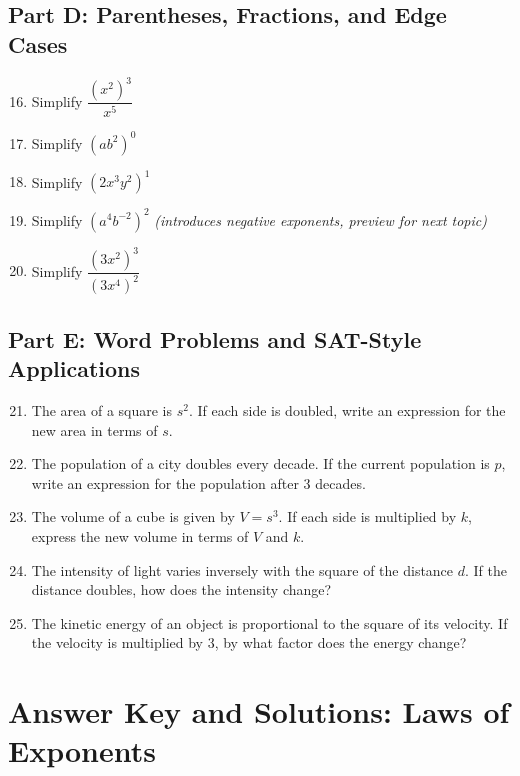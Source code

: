 \documentclass[12pt]{article}
\begin{document}
\subsection*{Part D: Parentheses, Fractions, and Edge Cases}
\begin{enumerate}
  \setcounter{enumi}{15}
  \item Simplify \(\dfrac{(x^2)^3}{x^5}\)
  \item Simplify \((ab^2)^0\)
  \item Simplify \((2x^3y^2)^1\)
  \item Simplify \((a^4b^{-2})^2\) \textit{(introduces negative exponents, preview for next topic)}
  \item Simplify \(\dfrac{(3x^2)^3}{(3x^4)^2}\)
\end{enumerate}

\subsection*{Part E: Word Problems and SAT-Style Applications}
\begin{enumerate}
  \setcounter{enumi}{20}
  \item The area of a square is \(s^2\). If each side is doubled, write an expression for the new area in terms of \(s\).
  \item The population of a city doubles every decade. If the current population is \(p\), write an expression for the population after 3 decades.
  \item The volume of a cube is given by \(V = s^3\). If each side is multiplied by \(k\), express the new volume in terms of \(V\) and \(k\).
  \item The intensity of light varies inversely with the square of the distance \(d\). If the distance doubles, how does the intensity change?
  \item The kinetic energy of an object is proportional to the square of its velocity. If the velocity is multiplied by 3, by what factor does the energy change?
\end{enumerate}

\newpage


\section*{Answer Key and Solutions: Laws of Exponents}
\end{document}
